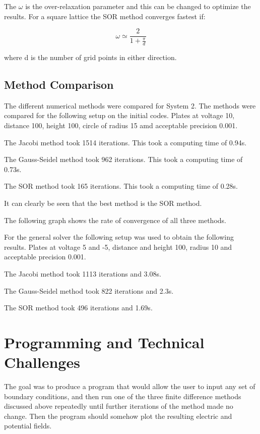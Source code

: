 \documentclass{article}
\begin{document}
The $\omega$ is the over-relaxation parameter and this can be changed to optimize the results. For a square lattice the SOR method converges fastest if:


\begin{equation}
\omega \simeq \frac{2}{1 + \frac{\pi}{d}}
\end{equation}

where d is the number of grid points in either direction. \cite{numericalmethods}

\subsection{Method Comparison}

The different numerical methods were compared for System 2. The methods were compared for the following setup on the initial codes. Plates at voltage 10, distance 100, height 100, circle of radius 15 amd acceptable precision 0.001.



The Jacobi method took 1514 iterations. This took a computing time of 0.94s.


The Gauss-Seidel method took 962 iterations. This took a computing time of 0.73s.


The SOR method took 165 iterations. This took a computing time of 0.28s.




It can clearly be seen that the best method is the SOR method.


The following graph shows the rate of convergence of all three methods.




For the general solver the following setup was used to obtain the following results. Plates at voltage 5 and -5, distance and height 100, radius 10 and acceptable precision 0.001.


The Jacobi method took 1113 iterations and 3.08s.




The Gauss-Seidel method took 822 iterations and 2.3s.


The SOR method took 496 iterations and 1.69s.




\section{Programming and Technical Challenges}
The goal was to produce a program that would allow the user to input any set of boundary conditions, and then run one of the three finite difference methods discussed above repeatedly until further iterations of the method made no change. Then the program should somehow plot the resulting electric and potential fields.
\end{document}
